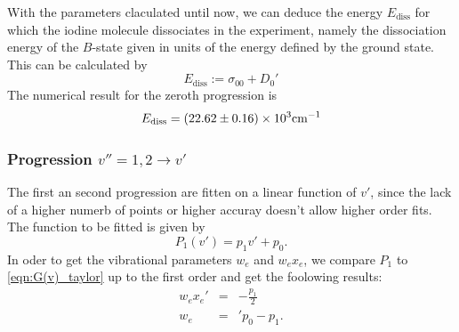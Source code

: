 With the parameters claculated until now, we can deduce the energy $E_\mathrm{diss}$ 
for which the iodine molecule dissociates in the experiment, 
namely the dissociation energy of the $B$-state given in units of the 
energy defined by the ground state. This can be calculated by
\begin{equation}
    E_\mathrm{diss} := \sigma_{00} + D_0'
    \label{eq:E_diss}
\end{equation}
The numerical result for the zeroth progression is
\begin{equation}
    E_\mathrm{diss} = \left(22.62 \pm 0.16\right) \times 10^{3} \mathrm{cm^{-1}}
\end{equation}

\newpage



\subsubsection{Progression $v'' = 1, 2 \rightarrow v'$}
The first an second progression are fitten on a linear function of $v'$, since 
the lack of a higher numerb of points or higher accuray doesn't allow higher order fits.
The function to be fitted is given by
\begin{equation}
    P_1(v') = p_1 v' + p_0.
\end{equation}
In oder to get the vibrational parameters $w_e$ and $w_e x_e$, we compare $P_1$ to 
\eqref{eqn:G(v)_taylor} up to the first order and get the foolowing results: 
\begin{eqnarray}
    w_e x_e' &=& -\frac{p_1}{2} \\
    w_e &=&' p_0 - p_1.
\end{eqnarray}

